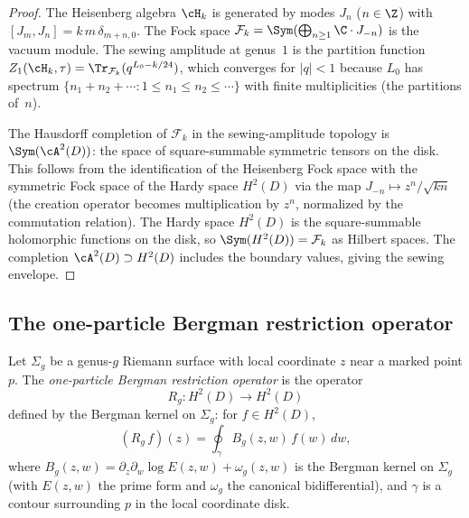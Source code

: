 \begin{proof}
The Heisenberg algebra $\cH_k$ is generated by modes $J_n$
($n \in \Z$) with $[J_m, J_n] = k\,m\,\delta_{m+n,0}$. The
Fock space $\mathcal{F}_k = \Sym(\bigoplus_{n \ge 1} \C \cdot J_{-n})$
is the vacuum module. The sewing amplitude at genus~$1$ is the
partition function
$Z_1(\cH_k, \tau) = \Tr_{\mathcal{F}_k}(q^{L_0 - k/24})$,
which converges for $|q| < 1$ because $L_0$ has spectrum
$\{n_1 + n_2 + \cdots : 1 \le n_1 \le n_2 \le \cdots\}$
with finite multiplicities (the partitions of~$n$).

The Hausdorff completion of $\mathcal{F}_k$ in the sewing-amplitude
topology is $\Sym(\cA^2(D))$: the space of square-summable
symmetric tensors on the disk. This follows from the identification
of the Heisenberg Fock space with the symmetric Fock space of the
Hardy space $H^2(D)$ via the map $J_{-n} \mapsto z^n/\sqrt{kn}$
(the creation operator becomes multiplication by $z^n$, normalized
by the commutation relation). The Hardy space $H^2(D)$ is the
square-summable holomorphic functions on the disk, so
$\Sym(H^2(D)) = \mathcal{F}_k$ as Hilbert spaces. The completion
$\cA^2(D) \supset H^2(D)$ includes the boundary values, giving
the sewing envelope.
\end{proof}

\subsection{The one-particle Bergman restriction operator}

\begin{definition}
Let $\Sigma_g$ be a genus-$g$ Riemann surface with local
coordinate $z$ near a marked point $p$. The \emph{one-particle
Bergman restriction operator} is the operator
\begin{equation}
R_g \colon H^2(D) \longrightarrow H^2(D)
\end{equation}
defined by the Bergman kernel on $\Sigma_g$: for
$f \in H^2(D)$,
\[
(R_g\, f)(z) = \oint_\gamma B_g(z, w)\, f(w)\, dw,
\]
where $B_g(z, w) = \partial_z \partial_w \log E(z,w) + \omega_g(z,w)$
is the Bergman kernel on $\Sigma_g$ (with $E(z,w)$ the prime
form and $\omega_g$ the canonical bidifferential), and $\gamma$ is
a contour surrounding $p$ in the local coordinate disk.
\end{definition}

